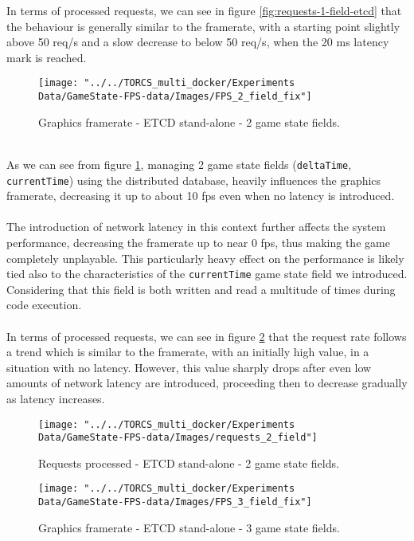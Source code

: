 In terms of processed requests, we can see in figure \ref{fig:requests-1-field-etcd} that the behaviour is generally similar to the framerate, with a starting point slightly above 50 req/s and a slow decrease to below 50 req/s, when the 20 ms latency mark is reached. \\
\begin{figure}[h!]
	\centering
	\texttt{[image: "../../TORCS\_multi\_docker/Experiments Data/GameState-FPS-data/Images/FPS\_2\_field\_fix"]}
	\caption[Graphics framerate - ETCD stand-alone - 2 game state fields]{Graphics framerate - ETCD stand-alone - 2 game state fields.}
	\label{fig:fps-2-field-etcd}
\end{figure}
\\ As we can see from figure \ref{fig:fps-2-field-etcd}, managing 2 game state fields (\texttt{deltaTime}, \texttt{currentTime}) using the distributed database, heavily influences the graphics framerate, decreasing it up to about 10 fps even when no latency is introduced. \\ \\
The introduction of network latency in this context further affects the system performance, decreasing the framerate up to near 0 fps, thus making the game completely unplayable. This particularly heavy effect on the performance is likely tied also to the characteristics of the \texttt{currentTime} game state field we introduced. Considering that this field is both written and read a multitude of times during code execution. \\ \\
In terms of processed requests, we can see in figure \ref{fig:requests-2-field-etcd} that the request rate follows a trend which is similar to the framerate, with an initially high value, in a situation with no latency. However, this value sharply drops after even low amounts of network latency are introduced, proceeding then to decrease gradually as latency increases. \\
\begin{figure}[h!]
	\centering
	\texttt{[image: "../../TORCS\_multi\_docker/Experiments Data/GameState-FPS-data/Images/requests\_2\_field"]}
	\caption[Requests processed - ETCD stand-alone - 2 game state fields]{Requests processed - ETCD stand-alone - 2 game state fields.}
	\label{fig:requests-2-field-etcd}
\end{figure}
\begin{figure}[h!]
	\centering
	\texttt{[image: "../../TORCS\_multi\_docker/Experiments Data/GameState-FPS-data/Images/FPS\_3\_field\_fix"]}
	\caption[Graphics framerate - ETCD stand-alone - 3 game state fields]{Graphics framerate - ETCD stand-alone - 3 game state fields.}
	\label{fig:fps-3-field-etcd}
\end{figure}
